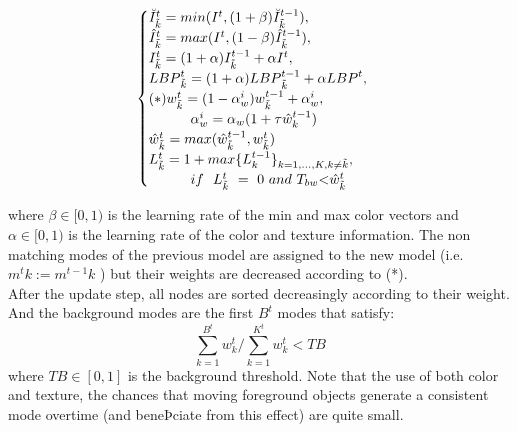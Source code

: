 \documentclass[10pt,letterpaper]{article}
\begin{document}
\begin{equation}
   \begin{cases} 
     \breve{I}_{\tilde{k}}^{t} = min (I^{t}, (1 + \beta) \breve{I}_{\tilde{k}}^{t-1}), \\
     \hat{I}_{\tilde{k}}^{t} = max (I^{t}, (1 - \beta) \hat{I}_{\tilde{k}}^{t-1}), \\
     {I}_{\tilde{k}}^{t} = (1 + \alpha) {I}_{\tilde{k}}^{t-1} + \alpha	{I}^{t}, \\
     {LBP}_{\tilde{k}}^{t} = (1 + \alpha) {LBP}_{\tilde{k}}^{t-1} + \alpha	{LBP}^{t}, \\
     (*)w^{t}_{\tilde k}= (1 - \alpha^{i}_{w}) {w}_{\tilde{k}}^{t-1} + \alpha^{i}_{w},\\ ~~~ ~~~ ~~~ \alpha^{i}_{w}=\alpha_{w}(1+\tau\hat{w}^{t-1}_{k}) \\
     \hat{w}^{t}_{\tilde{k}} = max (\hat{w}^{t-1}_{\tilde{k}}, w^{t}_{\tilde{k}})\\
     L^{t}_{\tilde{k}} = 1+ max \{L^{t-1}_{k}\}_{k=1,\dots,K, k \neq \tilde{k}},\\ ~~~ ~~~ ~~~ if~~ L^{t}_{\tilde{k}}~=~0~and~T_{bw} $\textless$\hat{w}_{\tilde{k}}^{t} \\
   \end{cases} 
\end{equation}

where $\beta \in [0,1)$ is the learning rate of the min and max color vectors and $\alpha \in [0,1)$ is the learning rate of the color and texture information. The non matching modes of the previous model are assigned to the new model (i.e. $m^{t}{k}:=m^{t-1}{k}$ ) but their weights are decreased according to (*).
\\
After the update step, all nodes are sorted decreasingly according to their weight. And the background modes are the first $B^{t}$ modes that satisfy:
\begin {equation}\sum_{k=1}^{B^{t}} w_{k}^{t} / \sum_{k=1}^{K^{t}} w_{k}^{t} < TB \end{equation} where $TB  \in [0,1]$ is the background threshold.
Note that the use of both color and texture, the chances that moving foreground objects generate a consistent mode overtime (and beneÞciate from this effect) are quite small.\\
\end{document}
